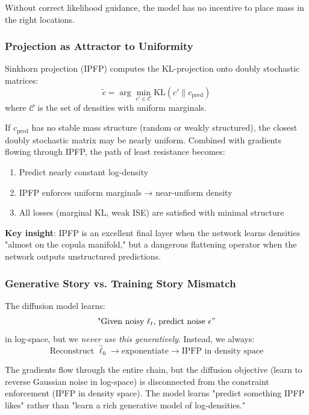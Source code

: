 \documentclass[11pt]{article}
\begin{document}
Without correct likelihood guidance, the model has no incentive to place mass in the right locations.

\subsubsection{Projection as Attractor to Uniformity}

Sinkhorn projection (IPFP) computes the KL-projection onto doubly stochastic matrices:
\begin{equation}
\tilde{c} = \arg\min_{c' \in \mathcal{C}} \text{KL}(c' \| c_{\text{pred}})
\end{equation}
where $\mathcal{C}$ is the set of densities with uniform marginals.

If $c_{\text{pred}}$ has no stable mass structure (random or weakly structured), the closest doubly stochastic matrix may be nearly uniform. Combined with gradients flowing through IPFP, the path of least resistance becomes:
\begin{enumerate}
    \item Predict nearly constant log-density
    \item IPFP enforces uniform marginals → near-uniform density
    \item All losses (marginal KL, weak ISE) are satisfied with minimal structure
\end{enumerate}

\textbf{Key insight}: IPFP is an excellent final layer when the network learns densities "almost on the copula manifold," but a dangerous flattening operator when the network outputs unstructured predictions.

\subsubsection{Generative Story vs. Training Story Mismatch}

The diffusion model learns:
\begin{equation}
\text{"Given noisy } \ell_t \text{, predict noise } \epsilon"
\end{equation}
in log-space, but we \emph{never use this generatively}. Instead, we always:
\begin{equation}
\text{Reconstruct } \hat{\ell}_0 \to \text{exponentiate} \to \text{IPFP in density space}
\end{equation}

The gradients flow through the entire chain, but the diffusion objective (learn to reverse Gaussian noise in log-space) is disconnected from the constraint enforcement (IPFP in density space). The model learns "predict something IPFP likes" rather than "learn a rich generative model of log-densities."
\end{document}
